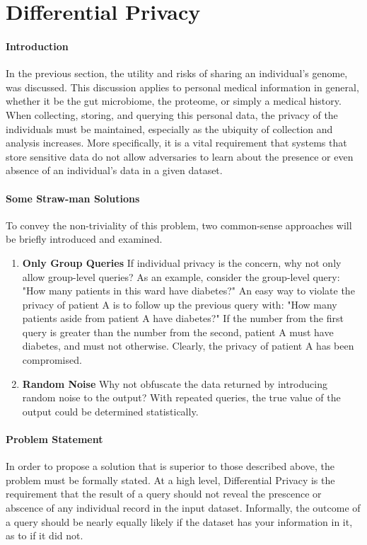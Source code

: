 \pagebreak
\section{Differential Privacy}

\paragraph{Introduction}
In the previous section, the utility and risks of sharing an individual's genome, was discussed. This discussion applies to personal medical information in general, whether it be the gut microbiome, the proteome, or simply a medical history. When collecting, storing, and querying this personal data, the privacy of the individuals must be maintained, especially as the ubiquity of collection and analysis increases. More specifically, it is a vital requirement that systems that store sensitive data do not allow adversaries to learn about the presence or even absence of an individual's data in a given dataset.

\paragraph{Some Straw-man Solutions}
To convey the non-triviality of this problem, two common-sense approaches will be briefly introduced and examined.

\begin{enumerate}
\item \textbf{Only Group Queries} If individual privacy is the concern, why not only allow group-level queries? As an example, consider the group-level query: "How many patients in this ward have diabetes?" An easy way to violate the privacy of patient A is to follow up the previous query with: "How many patients aside from patient A have diabetes?" If the number from the first query is greater than the number from the second, patient A must have diabetes, and must not otherwise. Clearly, the privacy of patient A has been compromised.
\item \textbf{Random Noise} Why not obfuscate the data returned by introducing random noise to the output? With repeated queries, the true value of the output could be determined statistically.
\end{enumerate}

\paragraph{Problem Statement}
In order to propose a solution that is superior to those described above, the problem must be formally stated. At a high level, Differential Privacy is the requirement that the result of a query should not reveal the prescence or abscence of any individual record in the input dataset. Informally, the outcome of a query should be nearly equally likely if the dataset has your information in it, as to if it did not.

